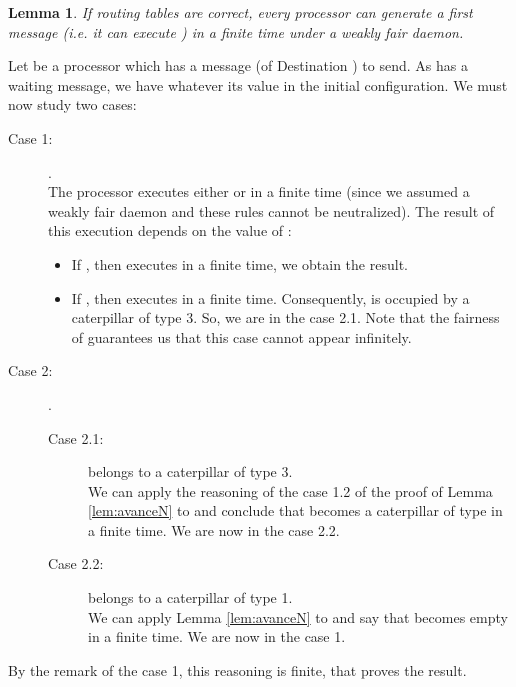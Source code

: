 \documentclass[11pt]{article}
\newtheorem{lemma}{Lemma}
\newenvironment{proof}{{\noindent\bf Proof. } }{{\hfill }}
\begin{document}
\begin{lemma} \label{lem:depotN}
If routing tables are correct, every processor can generate a first message (\emph{i.e.} it can execute ) in a finite time under a weakly fair daemon.
\end{lemma}

\begin{proof}
Let  be a processor which has a message  (of Destination ) to send. As  has a waiting message, we have  whatever its value in the initial configuration. We must now study two cases:

\begin{description}
\item [Case 1:] .\\
The processor  executes either  or  in a finite time (since we assumed a weakly fair daemon and these rules cannot be neutralized).
The result of this execution depends on the value of :

\begin{itemize}
\item If , then  executes  in a finite time, we obtain the result.
\item If , then  executes  in a finite time. Consequently,  is occupied by a caterpillar of type 3. So, we are in the case 2.1. Note that the fairness of  guarantees us that this case cannot appear infinitely. 
\end{itemize}

\item [Case 2:] .\\

\begin{description}
\item [Case 2.1:]  belongs to a caterpillar  of type 3.\\
We can apply the reasoning of the case 1.2 of the proof of Lemma \ref{lem:avanceN} to  and conclude that  becomes a caterpillar of type  in a finite time. We are now in the case 2.2.
\item [Case 2.2:]  belongs to a caterpillar  of type 1.\\
We can apply Lemma \ref{lem:avanceN} to  and say that  becomes empty in a finite time. We are now in the case 1.
\end{description}

\end{description}

By the remark of the case 1, this reasoning is finite, that proves the result.
\end{proof}
\end{document}
